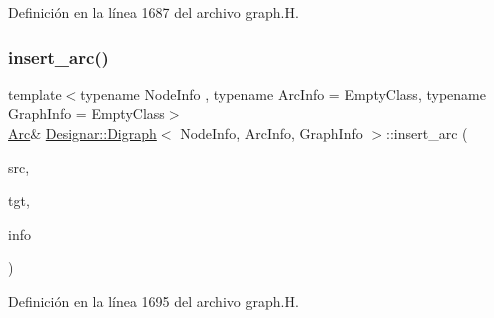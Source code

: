 Definición en la línea 1687 del archivo graph.\+H.

\mbox{\label{class_designar_1_1_digraph_a58d7f0e13a9e42cbc9e28683b527ca72}} 
\subsubsection{\texorpdfstring{insert\+\_\+arc()}{insert\_arc()}\hspace{0.1cm}{\footnotesize\ttfamily [3/4]}}
{\footnotesize\ttfamily template$<$typename Node\+Info , typename Arc\+Info  = Empty\+Class, typename Graph\+Info  = Empty\+Class$>$ \\
\hyperlink{class_designar_1_1_digraph_a0ceb278671f2a535c00fddccdeafd69f}{Arc}\& \hyperlink{class_designar_1_1_digraph}{Designar\+::\+Digraph}$<$ Node\+Info, Arc\+Info, Graph\+Info $>$\+::insert\+\_\+arc (\begin{DoxyParamCaption}\item[{\hyperlink{class_designar_1_1_digraph_a4dc921c41a480b7946a04170e997d8ae}{Node} \&}]{src,  }\item[{\hyperlink{class_designar_1_1_digraph_a4dc921c41a480b7946a04170e997d8ae}{Node} \&}]{tgt,  }\item[{const Arc\+Info \&}]{info }\end{DoxyParamCaption})\hspace{0.3cm}{\ttfamily [inline]}}



Definición en la línea 1695 del archivo graph.\+H.

\mbox{\label{class_designar_1_1_digraph_a9e46012a65696859c131d0bc5e096f55}} 
